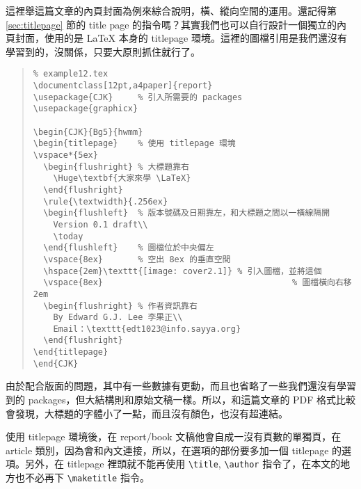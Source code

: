這裡舉這篇文章的內頁封面為例來綜合說明，橫、縱向空間的運用。還記得第 \ref{sec:titlepage} 節的 title page 的指令嗎？其實我們也可以自行設計一個獨立的內頁封面，使用的是 \LaTeX{} 本身的 {\ttfamily titlepage} 環境。這裡的圖檔引用是我們還沒有學習到的，沒關係，只要大原則抓住就行了。

\begin{quote}
   \begin{verbatim}
% example12.tex
\documentclass[12pt,a4paper]{report}
\usepackage{CJK}     % 引入所需要的 packages
\usepackage{graphicx}

\begin{CJK}{Bg5}{hwmm}
\begin{titlepage}    % 使用 titlepage 環境
\vspace*{5ex}
  \begin{flushright} % 大標題靠右
    \Huge\textbf{大家來學 \LaTeX}
  \end{flushright}
  \rule{\textwidth}{.256ex}
  \begin{flushleft}  % 版本號碼及日期靠左，和大標題之間以一橫線隔開
    Version 0.1 draft\\
    \today
  \end{flushleft}    % 圖檔位於中央偏左
  \vspace{8ex}       % 空出 8ex 的垂直空間
  \hspace{2em}\texttt{[image: cover2.1]} % 引入圖檔，並將這個
  \vspace{8ex}                                      % 圖檔橫向右移 2em
  \begin{flushright} % 作者資訊靠右
    By Edward G.J. Lee 李果正\\
    Email：\texttt{edt1023@info.sayya.org}
  \end{flushright}
\end{titlepage}
\end{CJK}

\end{verbatim}
\end{quote}

由於配合版面的問題，其中有一些數據有更動，而且也省略了一些我們還沒有學習到的 packages，但大結構則和原始文稿一樣。所以，和這篇文章的 PDF 格式比較會發現，大標題的字體小了一點，而且沒有顏色，也沒有超連結。

使用 {\ttfamily titlepage} 環境後，在 {\ttfamily report/book} 文稿他會自成一沒有頁數的單獨頁，在 {\ttfamily article} 類別，因為會和內文連接，所以，在選項的部份要多加一個 {\ttfamily titlepage} 的選項。另外，在 {\ttfamily titlepage} 裡頭就不能再使用 \verb|\title|, \verb=\author= 指令了，在本文的地方也不必再下 \verb=\maketitle= 指令。

